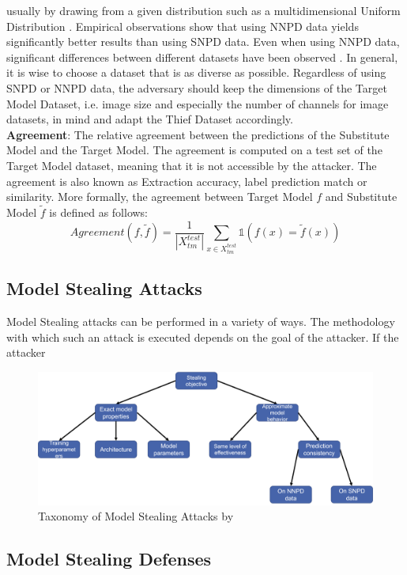 usually by drawing from a given distribution such as a multidimensional Uniform Distribution \cite{pal2020activethief}. Empirical observations show that using NNPD data
yields significantly better results than using SNPD data. Even when using NNPD data, significant differences between different datasets have been observed 
\cite{pal2020activethief}. In general, it is wise to choose a dataset that is as diverse as possible. Regardless of using SNPD or NNPD data, the adversary should keep the
dimensions of the Target Model Dataset, i.e. image size and especially the number of channels for image datasets, in mind and adapt the Thief Dataset accordingly. \\
\textbf{Agreement}: The relative agreement between the predictions of the Substitute Model and the Target Model. The agreement is computed on a test set of the Target 
Model dataset, meaning that it is not accessible by the attacker. The agreement is also known as Extraction accuracy, label prediction match or similarity. More formally,
the agreement between Target Model $f$ and Substitute Model $\tilde{f}$ is defined as follows:
\begin{equation}
    Agreement(f,\tilde{f}) = \frac{1}{|X_{tm}^{test}|} \sum_{x \in X_{tm}^{test}} \mathds{1}(f(x) = \tilde{f}(x))
\end{equation}




\subsection{Model Stealing Attacks}
\label{sec:ModelStealing:Attacks}
Model Stealing attacks can be performed in a variety of ways. The methodology with which such an attack is executed depends on the goal of the attacker. If the attacker

\begin{figure} [ht]
  \centering
  \includegraphics[width=.9\linewidth]{images/MS_Taxonomy.png}
  \caption[Model Stealing Taxonomy]{Taxonomy of Model Stealing Attacks by \cite{oliynyk2022know}}
  \label{fig:ModelStealing:Taxonomy}
\end{figure}


\subsection{Model Stealing Defenses}
\label{sec:ModelStealing:Defenses}